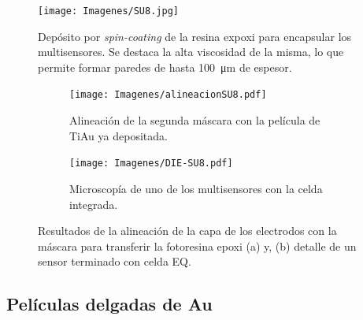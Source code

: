 			  	\begin{figure}[th!]
 				\centering
 				\texttt{[image: Imagenes/SU8.jpg]}
 				\caption[Depósito de la resina epoxi SU8]{Depósito por \textit{spin-coating }de la resina expoxi para encapsular los multisensores. Se destaca la alta viscosidad de la misma, lo que permite formar paredes de hasta \SI{100}{\um} de espesor.}
 				\label{fig:su8}
 				\vspace*{6mm}
 				\end{figure}
 		
 				\begin{figure}[th!]
			 	   	    \centering
			 	   	    \begin{subfigure}[t]{0.495\textwidth}
			        	\texttt{[image: Imagenes/alineacionSU8.pdf]}
			       		\caption{Alineación de la segunda máscara con la película de Ti\textbar Au ya depositada.}
			         	\label{fig:alineacion}
			     		\end{subfigure}
			     		\begin{subfigure}[t]{0.495\textwidth}
			     		\texttt{[image: Imagenes/DIE-SU8.pdf]}
			    		\caption{Microscopía de uno de los multisensores con la celda integrada.}
			     		\label{fig:die-su8}	
						\end{subfigure}
						\caption[Alineación y celda integrada en SU8]{Resultados de la alineación de la capa de los electrodos con la máscara para transferir la fotoresina epoxi (a) y, (b) detalle de un sensor terminado con celda EQ.}
			     		\label{fig:resultados-su8}
			     	   	\end{figure}

	\subsection{Películas delgadas de Au}

